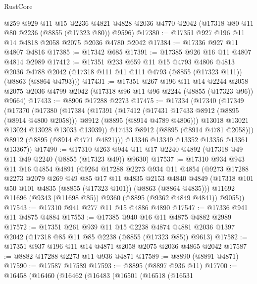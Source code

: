 \begin{lexlean}{RustCore}
\begin{coremodule}
    @259
    @929
    @11
    @15
    @2236
    @4821
    @4828
    @2036
    @4770
    @2042
    (@17318 @80 @11 @80 @2236 (@8855 (@17323 @80)) @9596)
@17380 := @17351 @927 @196 @11 @14 @4818 @2058 @2075 @2036 @4780 @2042
@17384 := @17336 @927 @11 @4807 @4816
@17385 := @17342 @685
@17391 := @17385 @926 @16 @11 @4807 @4814 @2989
@17412 := @17351
    @233
    @659
    @11
    @15
    @4793
    @4806
    @4813
    @2036
    @4788
    @2042
    (@17318 @111 @11 @111 @4793 (@8855 (@17323 @111)) (@8863 (@8864 @4793)))
@17431 := @17351
    @267
    @196
    @11
    @14
    @2244
    @2058
    @2075
    @2036
    @4799
    @2042
    (@17318 @96 @11 @96 @2244 (@8855 (@17323 @96)) @9664)
@17433 := @8906 @17288 @2273
@17475 := @17334
    (@17340
      (@17349
        (@17370
          (@17380
            (@17384
              (@17391
                (@17412
                  (@17431 @17433 @8912 (@8895 (@8914 @4800 @2058)))
                  @8912
                  (@8895 (@8914 @4789 @4806)))
                @13018
                @13021
                @13024
                @13028
                @13033
                @13039))
            @17433
            @8912
            (@8895 (@8914 @4781 @2058)))
          @8912
          (@8895 (@8914 @4771 @4821)))
        @13346
        @13349
        @13352
        @13356
        @13361
        @13367))
@17490 := @17310 @263 @944 @11 @17 @2240 @4892 (@17318 @49 @11 @49 @2240 (@8855 (@17323 @49)) @9630)
@17537 := @17310
    @934
    @943
    @11
    @16
    @4854
    @4891
    (@9264
      @17288
      @2273
      @934
      @11
      @4854
      (@9273
        @17288
        @2273
        @2079
        @269
        @49
        @85
        @17
        @11
        @4835
        @2153
        @4840
        @4849
        (@17318 @101 @50 @101 @4835 (@8855 (@17323 @101)) (@8863 (@8864 @4835)))
        @11692
        @11696
        (@9343 (@11698 @85))
        @9360
        (@8895 (@9362 @4849 @4841))
        @9055))
@17543 := @17310 @941 @277 @11 @15 @4886 @4890
@17547 := @17336 @941 @11 @4875 @4884
@17553 := @17385 @940 @16 @11 @4875 @4882 @2989
@17572 := @17351
    @261
    @939
    @11
    @15
    @2238
    @4874
    @4881
    @2036
    @1397
    @2042
    (@17318 @85 @11 @85 @2238 (@8855 (@17323 @85)) @9613)
@17582 := @17351 @937 @196 @11 @14 @4871 @2058 @2075 @2036 @4865 @2042
@17587 := @8882 @17288 @2273 @11 @936 @4871
@17589 := @8890 (@8891 @4871)
@17590 := @17587 @17589
@17593 := @8895 (@8897 @936 @11)
@17700 := @16458
    (@16460
      (@16462
        (@16483
          (@16501
            (@16518
              (@16531

\end{coremodule}
\end{lexlean}
